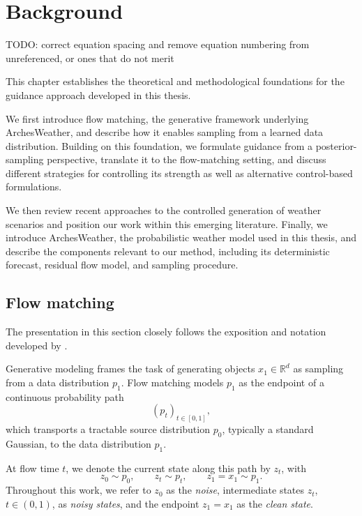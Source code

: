 \chapter{Background}
\label{ch:background}

TODO: correct equation spacing and remove equation numbering from unreferenced, or ones that do not merit 

This chapter establishes the theoretical and methodological foundations for the
guidance approach developed in this thesis.

We first introduce flow matching, the generative framework underlying
ArchesWeather, and describe how it enables sampling from a learned data
distribution. Building on this foundation, we formulate guidance from a
posterior-sampling perspective, translate it to the flow-matching setting, and
discuss different strategies for controlling its strength as well as
alternative control-based formulations.

We then review recent approaches to the controlled generation of weather
scenarios and position our work within this emerging literature. Finally, we
introduce ArchesWeather, the probabilistic weather model used in this thesis,
and describe the components relevant to our method, including its
deterministic forecast, residual flow model, and sampling procedure.

\section{Flow matching}

The presentation in this section closely follows the exposition and notation developed by
\textcite{flowsanddiffusions2026}.

Generative modeling frames the task of generating objects
$x_1 \in \mathbb{R}^d$ as sampling from a data distribution $p_1$.
Flow matching \parencite{lipman2023flow} models $p_1$ as the endpoint of a
continuous probability path
\[
    (p_t)_{t\in[0,1]},
\]
which transports a tractable source distribution \(p_0\), typically a standard
Gaussian, to the data distribution \(p_1\).

At flow time \(t\), we denote the current state along this path by \(z_t\),
with
\[
    z_0 \sim p_0,
    \qquad
    z_t \sim p_t,
    \qquad
    z_1 = x_1 \sim p_1.
\]
Throughout this work, we refer to \(z_0\) as the \emph{noise}, intermediate
states \(z_t\), \(t\in(0,1)\), as \emph{noisy states}, and the endpoint
\(z_1=x_1\) as the \emph{clean state}.

